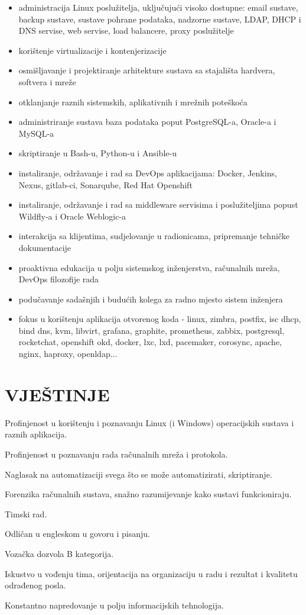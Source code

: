 \documentclass{cv}
\begin{document}
\begin{itemize}
    \setlength\itemsep{0.1cm}
    \item administracija Linux poslužitelja, uključujući visoko dostupne: email sustave, backup sustave, sustave pohrane podataka, nadzorne sustave, LDAP, DHCP i DNS servise, web servise, load balancere, proxy poslužitelje
    \item korištenje virtualizacije i kontenjerizacije
    \item osmišljavanje i projektiranje arhitekture sustava sa stajališta hardvera, softvera i mreže
    \item otklanjanje raznih sistemskih, aplikativnih i mrežnih poteškoća
    \item administriranje sustava baza podataka poput PostgreSQL-a, Oracle-a i MySQL-a
    \item skriptiranje u Bash-u, Python-u i Ansible-u 
    \item instaliranje, održavanje i rad sa DevOps aplikacijama: Docker, Jenkins, Nexus, gitlab-ci, Sonarqube, Red Hat Openshift
    \item instaliranje, održavanje i rad sa middleware servisima i poslužiteljima popust Wildfly-a i Oracle Weblogic-a
    \item interakcija sa klijentima, sudjelovanje u radionicama, pripremanje tehničke dokumentacije
    \item proaktivna edukacija u polju sistemskog inženjerstva, računalnih mreža, DevOps filozofije rada
    \item podučavanje sadašnjih i budućih kolega za radno mjesto sistem inženjera
    \item fokus u korištenju aplikacija otvorenog koda - linux, zimbra, postfix, isc dhcp, bind dns, kvm, libvirt, grafana, graphite, prometheus, zabbix, postgresql, rocketchat, openshift okd, docker, lxc, lxd, pacemaker, corosync, apache, nginx, haproxy, openldap...
\end{itemize}
\section{VJEŠTINJE}
Profinjenost u korištenju i poznavanju Linux (i Windows) operacijskih sustava i raznih aplikacija.

Profinjenost u poznavanju rada računalnih mreža i protokola.

Naglasak na automatizaciji svega što se može automatizirati, skriptiranje.

Forenzika računalnih sustava, snažno razumijevanje kako sustavi funkcioniraju.

Timski rad.

Odličan u engleskom u govoru i pisanju.

Vozačka dozvola B kategorija.

Iskustvo u vođenju tima, orijentacija na organizaciju u radu i rezultat i kvalitetu odrađenog posla.

Konstantno napredovanje u polju informacijskih tehnologija.
\end{document}
